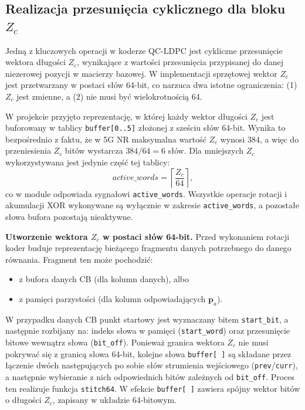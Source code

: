 \subsection{Realizacja przesunięcia cyklicznego dla bloku $Z_c$}
\label{subsec:ldpc_enc_cyclic_shift_impl}

Jedną z kluczowych operacji w koderze QC-LDPC jest cykliczne przesunięcie wektora długości $Z_c$,
wynikające z wartości przesunięcia przypisanej do danej niezerowej pozycji w macierzy bazowej.
W implementacji sprzętowej wektor $Z_c$ jest przetwarzany w postaci słów 64-bit, co narzuca dwa istotne ograniczenia:
(1) $Z_c$ jest zmienne, a (2) nie musi być wielokrotnością 64.

W projekcie przyjęto reprezentację, w której każdy wektor długości $Z_c$ jest buforowany w tablicy
\texttt{buffer[0..5]} złożonej z sześciu słów 64-bit. Wynika to bezpośrednio z faktu, że w 5G NR
maksymalna wartość $Z_c$ wynosi 384, a więc do przeniesienia $Z_c$ bitów wystarcza $384/64 = 6$ słów.
Dla mniejszych $Z_c$ wykorzystywana jest jedynie część tej tablicy:
\[
active\_words=\left\lceil \frac{Z_c}{64}\right\rceil,
\]
co w module odpowiada sygnałowi \texttt{active\_words}. Wszystkie operacje rotacji i akumulacji XOR wykonywane są
wyłącznie w zakresie \texttt{active\_words}, a pozostałe słowa bufora pozostają nieaktywne.

\medskip
\noindent\textbf{Utworzenie wektora $Z_c$ w postaci słów 64-bit.}
Przed wykonaniem rotacji koder buduje reprezentację bieżącego fragmentu danych potrzebnego do danego równania. Fragment ten może pochodzić:
\begin{itemize}
  \item z bufora danych CB (dla kolumn danych), albo
  \item z pamięci parzystości (dla kolumn odpowiadających $\mathbf{p}_a$).
\end{itemize}
W przypadku danych CB punkt startowy jest wyznaczany bitem \texttt{start\_bit}, a następnie rozbijany na:
indeks słowa w pamięci (\texttt{start\_word}) oraz przesunięcie bitowe wewnątrz słowa (\texttt{bit\_off}).
Ponieważ granica wektora $Z_c$ nie musi pokrywać się z granicą słowa 64-bit, kolejne słowa \texttt{buffer[ ]}
są składane przez łączenie dwóch następujących po sobie słów strumienia wejściowego
(\texttt{prev}/\texttt{curr}), a następnie wybieranie z nich odpowiednich bitów zależnych od \texttt{bit\_off}. Proces ten realizuje funkcja \texttt{stitch64}. W efekcie \texttt{buffer[ ]} zawiera spójny wektor bitów
o długości $Z_c$, zapisany w układzie 64-bitowym.

